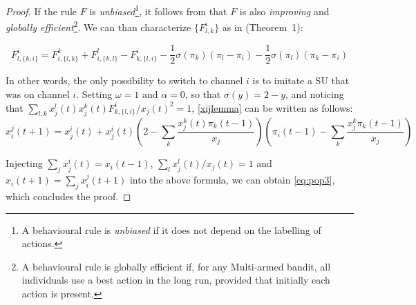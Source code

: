 \documentclass[12pt, onecolumn]{IEEEtran}
\theoremstyle{plain}
\theoremstyle{definition}
\begin{document}
\begin{proof}
If the rule $F$ is {\it unbiased}\footnote{A behavioural rule is {\it unbiased} if it does not depend on the labelling of actions.}, it follows from \cite{Schlag99} that $F$ is also {\it improving}
and {\it globally efficient}\footnote{A behavioural rule is globally efficient if, for any Multi-armed bandit, all individuals use a best action in the long run, provided that initially
each action is present.}. We can than characterize $\{F_{l,k}^i\}$ as in \cite{Schlag99} (Theorem~1):

\begin{equation*}
F_{l,\{k,i\}}^i=F_{i,\{l,k\}}^k+F_{i,\{k,l\}}^l-F_{k,\{l,i\}}^i-\frac{1}{2}\sigma(\pi_k)(\pi_l-\pi_i)-\frac{1}{2}\sigma(\pi_l)(\pi_k-\pi_i)
\end{equation*}

In other words, the only possibility to switch to channel $i$ is to imitate a SU that was on channel $i$.
Setting $\omega=1$ and $\alpha=0$, so that $\sigma(y)=2-y$, and noticing that $\sum_{l,k} x_j^l(t)x_j^k(t)F_{k,\{ l,i\} }^i/x_j(t)^2=1$, \eqref{xijlemma} can be written as follows:
\begin{equation*}
x_i^j(t+1)=x_j^i(t)+x_j^i(t)\left( 2-\sum_k\frac{x_j^k(t)\pi_k(t-1)}{x_j}\right)\left( \pi_i(t-1)-\sum_k\frac{x_j^k\pi_k(t-1)}{x_j}\right)
\end{equation*}

Injecting $\sum_j x_j^i(t)=x_i(t-1)$, $\sum_l x_j^l(t)/x_j(t)=1$ and $x_i(t+1)=\sum_j x_i^j(t+1)$ into the above formula, we can obtain \eqref{eq:pop3}, which concludes the proof.
\end{proof}

\begin{comment}

\begin{figure*}
\begin{minipage}[r]{0.49\linewidth}
\texttt{[image: DIvsAPPROX.eps]}
\caption{System dynamic and its approximation by double aggregate monotone dynamic.}
\label{fig:DIvsAPPROX}
\end{minipage} \hfill
\begin{minipage}[c]{0.49\linewidth}
\texttt{[image: PIRvsDI\_NO\_approx.eps]}
\caption{Double dynamic compared to the proportional dynamic.}
\label{fig:DIvsPIR}
\end{minipage}\hfill
\vspace{0.5cm}
\end{figure*}

\end{comment}
\end{document}
